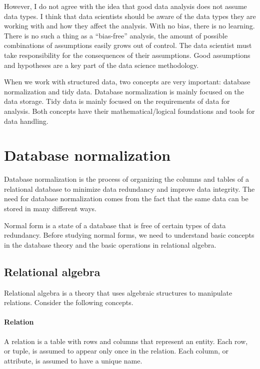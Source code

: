 However, I do not agree with the idea that good data analysis does not assume data types.
I think that data scientists should be aware of the data types they are working with and
how they affect the analysis.  With no bias, there is no learning.  There is no such a
thing as a ``bias-free'' analysis, the amount of possible combinations of assumptions
easily grows out of control.  The data scientist must take responsibility for the
consequences of their assumptions.  Good assumptions and hypotheses are a key part of the
data science methodology.

When we work with structured data, two concepts are very important: database normalization
and tidy data.  Database normalization is mainly focused on the data storage.  Tidy data is
mainly focused on the requirements of data for analysis.  Both concepts have their
mathematical/logical foundations and tools for data handling.

\section{Database normalization}
\label{sec:normalization}

Database normalization is the process of organizing the columns and tables of a relational
database to minimize data redundancy and improve data integrity.  The need for database
normalization comes from the fact that the same data can be stored in many different ways.

Normal form is a state of a database that is free of certain types of data redundancy.
Before studying normal forms, we need to understand basic concepts in the database theory
and the basic operations in relational algebra.

\subsection{Relational algebra}

Relational algebra is a theory that uses algebraic structures to manipulate relations.
Consider the following concepts.

\paragraph{Relation}  A relation is a table with rows and columns that represent
an entity.  Each row, or tuple, is assumed to appear only once in the relation.  Each
column, or attribute, is assumed to have a unique name.

